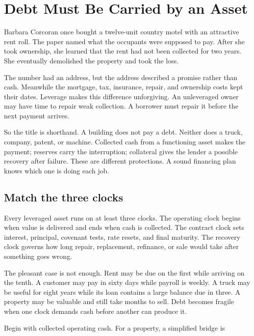 \chapter{Debt Must Be Carried by an Asset}

Barbara Corcoran once bought a twelve-unit country motel with an attractive
rent roll. The paper named what the occupants were supposed to pay. After she
took ownership, she learned that the rent had not been collected for two years.
She eventually demolished the property and took the loss.

The number had an address, but the address described a promise rather than
cash. Meanwhile the mortgage, tax, insurance, repair, and ownership costs kept
their dates. Leverage makes this difference unforgiving. An unleveraged owner
may have time to repair weak collection. A borrower must repair it before the
next payment arrives.

So the title is shorthand. A building does not pay a debt. Neither does a
truck, company, patent, or machine. Collected cash from a functioning asset
makes the payment; reserves carry the interruption; collateral gives the lender
a possible recovery after failure. These are different protections. A sound
financing plan knows which one is doing each job.

\section{Match the three clocks}

Every leveraged asset runs on at least three clocks. The operating clock begins
when value is delivered and ends when cash is collected. The contract clock
sets interest, principal, covenant tests, rate resets, and final maturity. The
recovery clock governs how long repair, replacement, refinance, or sale would
take after something goes wrong.

The pleasant case is not enough. Rent may be due on the first while arriving on
the tenth. A customer may pay in sixty days while payroll is weekly. A truck
may be useful for eight years while its loan contains a large balance due in
three. A property may be valuable and still take months to sell. Debt becomes
fragile when one clock demands cash before another can produce it.

Begin with collected operating cash. For a property, a simplified bridge is


